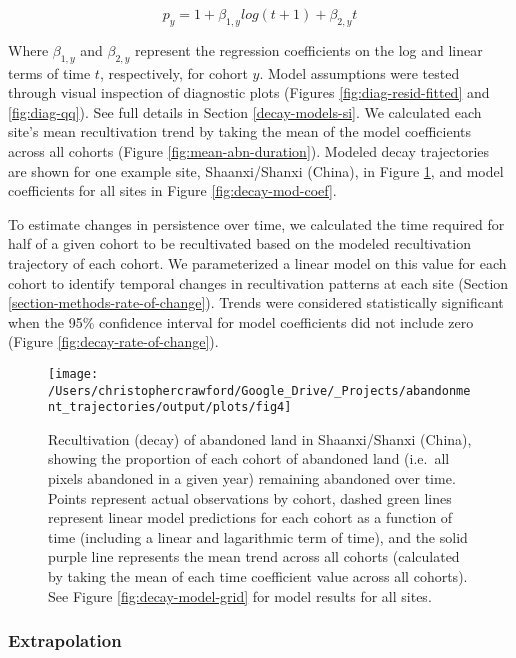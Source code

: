 \documentclass[9pt,twocolumn,twoside,lineno]{pnas-new}
\begin{document}
\begin{equation}
p_{y} = 1 + \beta_{1,y} log(t + 1) + \beta_{2,y} t \label{eq:mod-spec}
\end{equation}

Where \(\beta_{1,y}\) and \(\beta_{2,y}\) represent the regression coefficients on the log and linear terms of time \(t\), respectively, for cohort \(y\).
Model assumptions were tested through visual inspection of diagnostic plots (Figures \ref{fig:diag-resid-fitted} and \ref{fig:diag-qq}).
See full details in Section \ref{decay-models-si}.
We calculated each site's mean recultivation trend by taking the mean of the model coefficients across all cohorts (Figure \ref{fig:mean-abn-duration}).
Modeled decay trajectories are shown for one example site, Shaanxi/Shanxi (China), in Figure \ref{fig:abn-decay-s}, and model coefficients for all sites in Figure \ref{fig:decay-mod-coef}.

To estimate changes in persistence over time, we calculated the time required for half of a given cohort to be recultivated based on the modeled recultivation trajectory of each cohort.
We parameterized a linear model on this value for each cohort to identify temporal changes in recultivation patterns at each site (Section \ref{section-methods-rate-of-change}).
Trends were considered statistically significant when the 95\% confidence interval for model coefficients did not include zero (Figure \ref{fig:decay-rate-of-change}).



\begin{figure}
\texttt{[image: /Users/christophercrawford/Google\_Drive/\_Projects/abandonment\_trajectories/output/plots/fig4]} \caption{Recultivation (decay) of abandoned land in Shaanxi/Shanxi (China), showing the proportion of each cohort of abandoned land (i.e.~all pixels abandoned in a given year) remaining abandoned over time. Points represent actual observations by cohort, dashed green lines represent linear model predictions for each cohort as a function of time (including a linear and lagarithmic term of time), and the solid purple line represents the mean trend across all cohorts (calculated by taking the mean of each time coefficient value across all cohorts). See Figure \ref{fig:decay-model-grid} for model results for all sites.}\label{fig:abn-decay-s}
\end{figure}

\hypertarget{extrapolation}{%
\subsubsection{Extrapolation}\label{extrapolation}}
\end{document}
